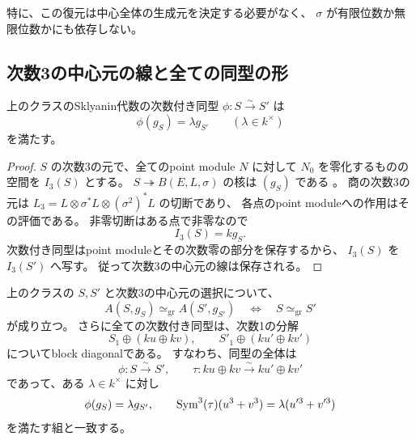 特に、この復元は中心全体の生成元を決定する必要がなく、
$\sigma$ が有限位数か無限位数かにも依存しない。

\subsection{次数3の中心元の線と全ての同型の形}

\begin{lemma}[次数3の中心元の線の不変性]\label{lem:canonical-central-line}
上のクラスのSklyanin代数の次数付き同型
$\phi:S\xrightarrow{\sim}S'$ は
\[
 \phi(g_S)=\lambda g_{S'}\qquad(\lambda\in k^\times)
\]
を満たす。
\end{lemma}

\begin{proof}
$S$ の次数3の元で、全てのpoint module $N$ に対して
$N_0$ を零化するものの空間を $I_3(S)$ とする。
$S\twoheadrightarrow B(E,L,\sigma)$ の核は $(g_S)$ である
\cite[Lemma 2.19]{WWY}。
商の次数3の元は $L_3=L\otimes\sigma^*L\otimes(\sigma^2)^*L$ の切断であり、
各点のpoint moduleへの作用はその評価である。
非零切断はある点で非零なので
\[
 I_3(S)=k g_S.
\]
次数付き同型はpoint moduleとその次数零の部分を保存するから、
$I_3(S)$ を $I_3(S')$ へ写す。
従って次数3の中心元の線は保存される。
\end{proof}

\begin{theorem}[五生成元代数の次数付き同型判定]\label{thm:five-generator-isom}
上のクラスの $S,S'$ と次数3の中心元の選択について、
\begin{equation}\label{eq:five-generator-isom}
 A(S,g_S)\simeq_{\mathrm{gr}}A(S',g_{S'})
 \quad\Longleftrightarrow\quad
 S\simeq_{\mathrm{gr}}S'
\end{equation}
が成り立つ。
さらに全ての次数付き同型は、次数1の分解
\[
 S_1\oplus(ku\oplus kv),\qquad S'_1\oplus(ku'\oplus kv')
\]
についてblock diagonalである。
すなわち、同型の全体は
\[
 \phi:S\xrightarrow{\sim}S',\qquad
 \tau:ku\oplus kv\xrightarrow{\sim}ku'\oplus kv'
\]
であって、ある $\lambda\in k^\times$ に対し
\begin{equation}\label{eq:five-generator-iso-pairs}
 \phi(g_S)=\lambda g_{S'},\qquad
 \operatorname{Sym}^3(\tau)(u^3+v^3)=\lambda(u'^3+v'^3)
\end{equation}
を満たす組と一致する。
\end{theorem}

